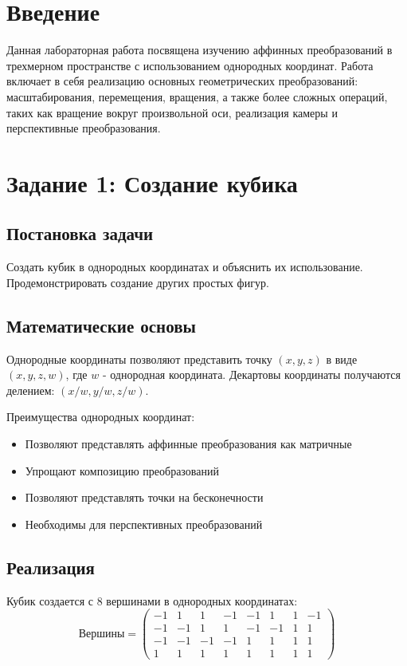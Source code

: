 \section*{Введение}

Данная лабораторная работа посвящена изучению аффинных преобразований в трехмерном пространстве с использованием однородных координат. Работа включает в себя реализацию основных геометрических преобразований: масштабирования, перемещения, вращения, а также более сложных операций, таких как вращение вокруг произвольной оси, реализация камеры и перспективные преобразования.

\section*{Задание 1: Создание кубика}

\subsection*{Постановка задачи}
Создать кубик в однородных координатах и объяснить их использование. Продемонстрировать создание других простых фигур.

\subsection*{Математические основы}
Однородные координаты позволяют представить точку $(x, y, z)$ в виде $(x, y, z, w)$, где $w$ - однородная координата. Декартовы координаты получаются делением: $(x/w, y/w, z/w)$.

Преимущества однородных координат:
\begin{itemize}
    \item Позволяют представлять аффинные преобразования как матричные
    \item Упрощают композицию преобразований
    \item Позволяют представлять точки на бесконечности
    \item Необходимы для перспективных преобразований
\end{itemize}

\subsection*{Реализация}
Кубик создается с 8 вершинами в однородных координатах:
\begin{equation}
\text{Вершины} = \begin{pmatrix}
-1 & 1 & 1 & -1 & -1 & 1 & 1 & -1 \\
-1 & -1 & 1 & 1 & -1 & -1 & 1 & 1 \\
-1 & -1 & -1 & -1 & 1 & 1 & 1 & 1 \\
1 & 1 & 1 & 1 & 1 & 1 & 1 & 1
\end{pmatrix}
\end{equation}

